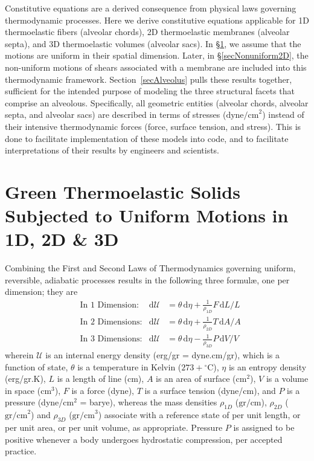 Constitutive equations are a derived consequence from physical laws governing thermo\-dynamic processes.  Here we derive constitutive equations applicable for 1D thermo\-elastic fibers (alveolar chords), 2D thermo\-elastic membranes (alveolar septa), and 3D thermo\-elastic volumes (alveolar sacs).  In \S\ref{secUniformCE}, we assume that the motions are uniform in their spatial dimension.  Later, in \S\ref{secNonuniform2D}, the non-uniform motions of shears associated with a membrane are included into this thermo\-dynamic framework.  Section~\ref{secAlveolus} pulls these results together, sufficient for the intended purpose of modeling the three structural facets that comprise an alveolous.  Specifically, all geometric entities (alveolar chords, alveolar septa, and alveolar sacs) are described in terms of stresses ($\text{dyne/cm}^2$) instead of their intensive thermo\-dynamic forces (force, surface tension, and stress).  This is done to facilitate implementation of these models into code, and to facilitate interpretations of their results by engineers and scientists.

\section{Green Thermoelastic Solids Subjected to Uniform Motions in 1D, 2D \& 3D}
\label{secUniformCE}

Combining the First and Second Laws of Thermo\-dynamics governing uniform, reversible, adiabatic processes results in the following three formul\ae, one per dimension; they are
\begin{subequations}
    \label{thermoelasticLaws}
    \begin{align}
    \mbox{} & \text{In 1 Dimension:} & 
    \mathrm{d}\mathcal{U} & = \theta \, \mathrm{d} \eta +
    \tfrac{1}{\rho_{1D}} F \, \mathrm{d}L / L
    \label{thermoelastic1Dlaw} \\
    \mbox{} & \text{In 2 Dimensions:} &
    \mathrm{d}\mathcal{U} & = \theta \, \mathrm{d} \eta + 
    \tfrac{1}{\rho_{2D}} T \, \mathrm{d}A / \! A
    \label{thermoelastic2Dlaw} \\
    \mbox{} & \text{In 3 Dimensions:} &
    \mathrm{d}\mathcal{U} & = \theta \, \mathrm{d} \eta - 
    \tfrac{1}{\rho_{3D}} P \, \mathrm{d}V \! / V \!
    \label{thermoelastic3Dlaw}
    \end{align}
\end{subequations}
wherein $\mathcal{U}$ is an internal energy density (erg/gr = dyne.cm/gr), which is a function of state, $\theta$ is a temperature in Kelvin ($273 + \mbox{}^{\circ}$C), $\eta$ is an entropy density (erg/gr.K), $L$ is a length of line (cm), $A$ is an area of surface ($\text{cm}^2$), $V$ is a volume in space ($\text{cm}^3$), $F$ is a force (dyne), $T$ is a surface tension (dyne/cm), and $P$ is a pressure (dyne/$\text{cm}^2$ = barye), whereas the mass densities $\rho_{1D}$ ($\text{gr/cm}$), $\rho_{2D}$ ($\text{gr/cm}^2$) and $\rho_{3D}$ ($\text{gr/cm}^3$) associate with a reference state of per unit length, or per unit area, or per unit volume, as appropriate.  Pressure $P$ is assigned to be positive whenever a body undergoes hydro\-static compression, per accepted practice.

